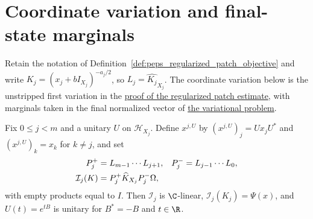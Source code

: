\section{Coordinate variation and final-state marginals}
\label{sec:peps_regularized_patch_stationarity}

Retain the notation of Definition~\ref{def:peps_regularized_patch_objective}
and write $K_j=(x_j+bI_{X_j})^{-a_j/2}$, so $L_j=\widehat{K_j}_{X_j}$.
The coordinate variation below is the unstripped first variation in the
\href{https://github.com/openai/math/blob/adc7f1241b42e322a6451854ab7e4b4c146bf78a/preprints/Polynomial-PEPS-approximation-of-gapped-square-grid-ground-states-September-24-2026/build/sections/03-patches.tex\#L134-L149}{proof of the regularized patch estimate},
with marginals taken in the final normalized vector of
\href{https://github.com/openai/math/blob/adc7f1241b42e322a6451854ab7e4b4c146bf78a/preprints/Polynomial-PEPS-approximation-of-gapped-square-grid-ground-states-September-24-2026/build/sections/03-patches.tex\#L91-L99}{the variational problem}.

\begin{definition}
    \label{def:peps_patch_coordinate_insertion}
    \leanok
    Fix $0\le j<m$ and a unitary $U$ on $\mathcal H_{X_j}$.
    Define $x^{j,U}$ by $(x^{j,U})_j=Ux_jU^*$ and $(x^{j,U})_k=x_k$ for $k\ne j$, and set
    \begin{align}
        P_j^+           & =L_{m-1}\cdots L_{j+1},            &
        P_j^-           & =L_{j-1}\cdots L_0,\notag            \\
        \mathcal I_j(K) & =P_j^+\widehat K_{X_j}P_j^-\Omega,
        \label{eq:peps_coordinate_insertion}
    \end{align}
    with empty products equal to $I$. Then $\mathcal I_j$ is $\C$-linear,
    $\mathcal I_j(K_j)=\Psi(x)$, and $U(t)=e^{tB}$ is unitary for $B^*=-B$ and $t\in\R$.
\end{definition}

